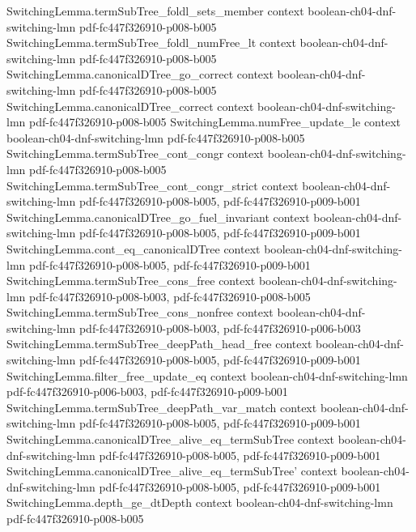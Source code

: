 \begin{theorem}
\proofstep
  {SwitchingLemma.termSubTree_foldl_sets_member}
  {context}
  {boolean-ch04-dnf-switching-lmn}
  {pdf-fc447f326910-p008-b005}
\proofstep
  {SwitchingLemma.termSubTree_foldl_numFree_lt}
  {context}
  {boolean-ch04-dnf-switching-lmn}
  {pdf-fc447f326910-p008-b005}
\proofstep
  {SwitchingLemma.canonicalDTree_go_correct}
  {context}
  {boolean-ch04-dnf-switching-lmn}
  {pdf-fc447f326910-p008-b005}
\proofstep
  {SwitchingLemma.canonicalDTree_correct}
  {context}
  {boolean-ch04-dnf-switching-lmn}
  {pdf-fc447f326910-p008-b005}
\proofstep
  {SwitchingLemma.numFree_update_le}
  {context}
  {boolean-ch04-dnf-switching-lmn}
  {pdf-fc447f326910-p008-b005}
\proofstep
  {SwitchingLemma.termSubTree_cont_congr}
  {context}
  {boolean-ch04-dnf-switching-lmn}
  {pdf-fc447f326910-p008-b005}
\proofstep
  {SwitchingLemma.termSubTree_cont_congr_strict}
  {context}
  {boolean-ch04-dnf-switching-lmn}
  {pdf-fc447f326910-p008-b005,
    pdf-fc447f326910-p009-b001}
\proofstep
  {SwitchingLemma.canonicalDTree_go_fuel_invariant}
  {context}
  {boolean-ch04-dnf-switching-lmn}
  {pdf-fc447f326910-p008-b005,
    pdf-fc447f326910-p009-b001}
\proofstep
  {SwitchingLemma.cont_eq_canonicalDTree}
  {context}
  {boolean-ch04-dnf-switching-lmn}
  {pdf-fc447f326910-p008-b005,
    pdf-fc447f326910-p009-b001}
\proofstep
  {SwitchingLemma.termSubTree_cons_free}
  {context}
  {boolean-ch04-dnf-switching-lmn}
  {pdf-fc447f326910-p008-b003,
    pdf-fc447f326910-p008-b005}
\proofstep
  {SwitchingLemma.termSubTree_cons_nonfree}
  {context}
  {boolean-ch04-dnf-switching-lmn}
  {pdf-fc447f326910-p008-b003,
    pdf-fc447f326910-p006-b003}
\proofstep
  {SwitchingLemma.termSubTree_deepPath_head_free}
  {context}
  {boolean-ch04-dnf-switching-lmn}
  {pdf-fc447f326910-p008-b005,
    pdf-fc447f326910-p009-b001}
\proofstep
  {SwitchingLemma.filter_free_update_eq}
  {context}
  {boolean-ch04-dnf-switching-lmn}
  {pdf-fc447f326910-p006-b003,
    pdf-fc447f326910-p009-b001}
\proofstep
  {SwitchingLemma.termSubTree_deepPath_var_match}
  {context}
  {boolean-ch04-dnf-switching-lmn}
  {pdf-fc447f326910-p008-b005,
    pdf-fc447f326910-p009-b001}
\proofstep
  {SwitchingLemma.canonicalDTree_alive_eq_termSubTree}
  {context}
  {boolean-ch04-dnf-switching-lmn}
  {pdf-fc447f326910-p008-b005,
    pdf-fc447f326910-p009-b001}
\proofstep
  {SwitchingLemma.canonicalDTree_alive_eq_termSubTree'}
  {context}
  {boolean-ch04-dnf-switching-lmn}
  {pdf-fc447f326910-p008-b005,
    pdf-fc447f326910-p009-b001}
\proofstep
  {SwitchingLemma.depth_ge_dtDepth}
  {context}
  {boolean-ch04-dnf-switching-lmn}
  {pdf-fc447f326910-p008-b005}

\end{theorem}
